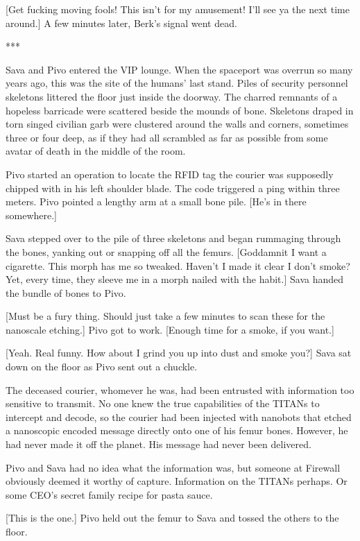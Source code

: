 [Get fucking moving fools! This isn't for my amusement! I'll see ya the next time around.] A few minutes later, Berk's signal went dead.

\begin{center} *** \end{center}

Sava and Pivo entered the VIP lounge. When the spaceport was overrun so many years ago, this was the site of the humans' last stand. Piles of security personnel skeletons littered the floor just inside the doorway. The charred remnants of a hopeless barricade were scattered beside the mounds of bone. Skeletons draped in torn singed civilian garb were clustered around the walls and corners, sometimes three or four deep, as if they had all scrambled as far as possible from some avatar of death in the middle of the room.

Pivo started an operation to locate the RFID tag the courier was supposedly chipped with in his left shoulder blade. The code triggered a ping within three meters. Pivo pointed a lengthy arm at a small bone pile. [He's in there somewhere.]

Sava stepped over to the pile of three skeletons and began rummaging through the bones, yanking out or snapping off all the femurs. [Goddamnit I want a cigarette. This morph has me so tweaked. Haven't I made it clear I don't smoke? Yet, every time, they sleeve me in a morph nailed with the habit.] Sava handed the bundle of bones to Pivo.

[Must be a fury thing. Should just take a few minutes to scan these for the nanoscale etching.] Pivo got to work. [Enough time for a smoke, if you want.]

[Yeah. Real funny. How about I grind you up into dust and smoke you?] Sava sat down on the floor as Pivo sent out a chuckle.

The deceased courier, whomever he was, had been entrusted with information too sensitive to transmit. No one knew the true capabilities of the TITANs to intercept and decode, so the courier had been injected with nanobots that etched a nanoscopic encoded message directly onto one of his femur bones. However, he had never made it off the planet. His message had never been delivered.

Pivo and Sava had no idea what the information was, but someone at Firewall obviously deemed it worthy of capture. Information on the TITANs perhaps. Or some CEO's secret family recipe for pasta sauce.

[This is the one.] Pivo held out the femur to Sava and tossed the others to the floor.

